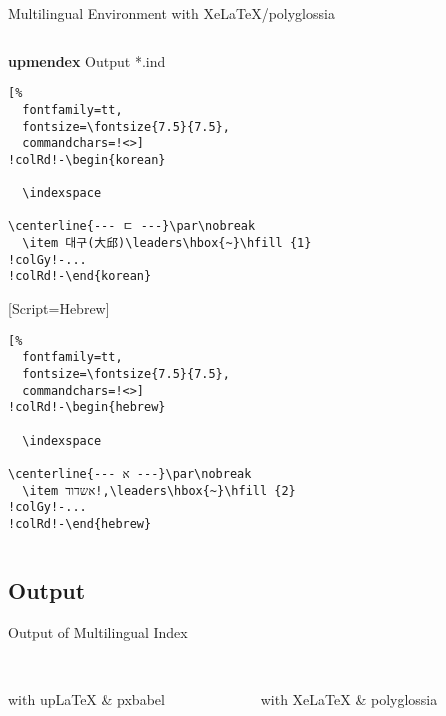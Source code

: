 \documentclass[aspectratio=169,10pt]{beamer}
\begin{document}
\begin{frame}[fragile]{Multilingual Environment with XeLaTeX/polyglossia}
\begin{columns}
\begin{column}{64mm}
\begin{exampleblock}{\textbf{upmendex} Output *.ind}
\begin{Verbatim}[%
  fontfamily=tt,
  fontsize=\fontsize{7.5}{7.5},
  commandchars=!<>]
!colRd!-\begin{korean}

  \indexspace

\centerline{--- ㄷ ---}\par\nobreak
  \item 대구(大邱)\leaders\hbox{~}\hfill {1}
!colGy!-...
!colRd!-\end{korean}
\end{Verbatim}
\setsansfont{SILEOT.ttf}
\setmonofont{DejaVu Sans}[Script=Hebrew]
\begin{hebrew}
\begin{Verbatim}[%
  fontfamily=tt,
  fontsize=\fontsize{7.5}{7.5},
  commandchars=!<>]
!colRd!-\begin{hebrew}

  \indexspace

\centerline{--- א ---}\par\nobreak
  \item אשדוד!,\leaders\hbox{~}\hfill {2}
!colGy!-...
!colRd!-\end{hebrew}
\end{Verbatim}
\end{hebrew}
\end{exampleblock}
\end{column}
\end{columns}

\end{frame}


\subsection{Output}
\begin{frame}[fragile]{Output of Multilingual Index}
\begin{columns}

\begin{column}{60mm}
\begin{center}
\\[1mm]%
\footnotesize with upLaTeX \& pxbabel
\end{center}
\end{column}

\begin{column}{60mm}
\begin{center}
\\[1mm]%
\footnotesize with XeLaTeX \& polyglossia
\end{center}
\end{column}
\end{columns}

\end{frame}
\end{document}

